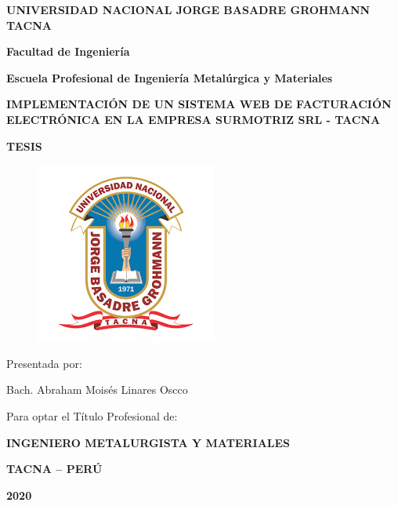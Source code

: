 \begin{titlepage}
    \begin{center}
        \LARGE{ \textbf{UNIVERSIDAD NACIONAL JORGE BASADRE GROHMANN TACNA}}\\
        \vspace{5mm}

        \large{ \textbf{Facultad de Ingeniería}} \\
        \vspace{5mm}

        \large{ \textbf{Escuela Profesional de Ingeniería Metalúrgica y Materiales}}\\
        \vspace{7mm}

        \large{}{ \textbf{IMPLEMENTACIÓN DE UN SISTEMA WEB DE FACTURACIÓN ELECTRÓNICA EN LA EMPRESA SURMOTRIZ SRL - TACNA}}\\
        \vspace{8mm}

        \LARGE{ \textbf{TESIS}}\\        
        
        \begin{figure}[h]
            \centering    
            \includegraphics[scale=1]{images/unjbg.png}
        \end{figure}

        \large{Presentada por:}\\
        \vspace{7mm}

        \large{ Bach. Abraham Moisés Linares Oscco} \\
        \vspace{7mm}

        \large{ Para optar el Título Profesional de:} \\
        \vspace{7mm}

        \large{}{ \textbf{INGENIERO METALURGISTA Y MATERIALES}}\\
        \vspace{8mm}

        \large{}{ \textbf{TACNA – PERÚ}}\\
        \vspace{5mm}

        \large{}{ \textbf{2020}}\\        

    \end{center}
\end{titlepage}
